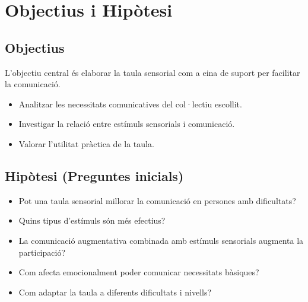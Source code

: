 \chapter{Objectius i Hipòtesi}

\section{Objectius}
L'objectiu central és elaborar la taula sensorial com a eina de suport per facilitar la comunicació.
\begin{itemize}
    \item Analitzar les necessitats comunicatives del col·lectiu escollit.
    \item Investigar la relació entre estímuls sensorials i comunicació.
    \item Valorar l'utilitat pràctica de la taula.
\end{itemize}

\section{Hipòtesi (Preguntes inicials)}
\begin{itemize}
    \item Pot una taula sensorial millorar la comunicació en persones amb dificultats?
    \item Quins tipus d'estímuls són més efectius?
    \item La comunicació augmentativa combinada amb estímuls sensorials augmenta la participació?
    \item Com afecta emocionalment poder comunicar necessitats bàsiques?
    \item Com adaptar la taula a diferents dificultats i nivells?
\end{itemize}